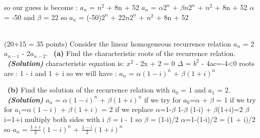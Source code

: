 \documentclass[a4 paper]{article}
\numberwithin{equation}{section}
\newcommand{\problem}[2]{~\\\fbox{\textbf{Problem #1}}\hfill (#2 points)\newline\newline}
\newcommand{\subproblem}[1]{~\newline\textbf{(#1)}}
\newcommand{\solution}{~\newline\textbf{\textit{(Solution)}} }
\newcommand{\0}{\mathbf{0}}
\begin{document}
so our guess is become :  $a_n$ = $n^2$ + 8n + 52
\newline
$a_n$ = $\alpha$$2^n$ + $\beta$$n2^n$ + $n^2$ + 8n + 52 \newline
$\alpha$= -50 and $\beta$ = 22 so $a_n$ = (-50)$2^n$ + 22$n2^n$ + $n^2$ + 8n + 52 \newline



\problem{3}{20+15 = 35}
Consider the linear homogeneous recurrence relation $a_n$ = 2$a_{n-1}$ - 2$a_{n-2}$.
\subproblem{a} Find the characteristic roots of the recurrence relation.
\solution
characteristic equation is: 
$x^2$ - 2x + 2 = 0 \newline
$\Delta$ = $b^2$ - 4ac=-4<0 \newline
roots are : 1 - i and 1 + i
so we will have : \newline
$a_n$ = $\alpha (1-i)^n$ + $\beta(1+i)^n$

\newline
\subproblem{b} Find the solution of the recurrence relation with $a_0$ = 1 and $a_1$ = 2.
\solution
$a_n$ = $\alpha (1-i)^n$ + $\beta(1+i)^n$
\newline
if we try for $a_0$=$\alpha$ + $\beta$ = 1\newline
if we try for  $a_1$=$\alpha(1-i)$ + $\beta(1+i)$ = 2 \newline
if we replace $\alpha$=1-$\beta$
1-$\beta$ (1-i) + $\beta$(1+i)=2 $\beta$i=1+i  multiply both sides with i $\beta$ = i - 1 so $\beta$ = (1-i)/2 \newline
$\alpha$=1-(1-i)/2 = (1 + i)/2
\newline
so $a_n$ = $\frac{1+i}{2} (1-i)^n$ + $\frac{1-i}{2}(1+i)^n$
\end{document}
